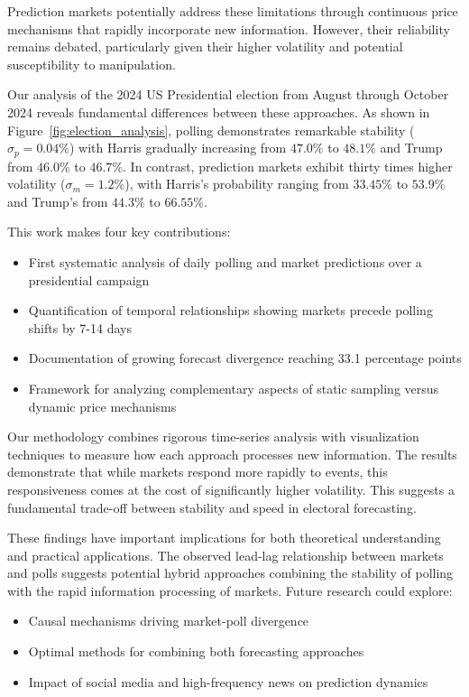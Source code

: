 \documentclass{article} %
\begin{document}
Prediction markets potentially address these limitations through continuous price mechanisms that rapidly incorporate new information. However, their reliability remains debated, particularly given their higher volatility and potential susceptibility to manipulation.

Our analysis of the 2024 US Presidential election from August through October 2024 reveals fundamental differences between these approaches. As shown in Figure~\ref{fig:election_analysis}, polling demonstrates remarkable stability ($\sigma_p = 0.04\%$) with Harris gradually increasing from $47.0\%$ to $48.1\%$ and Trump from $46.0\%$ to $46.7\%$. In contrast, prediction markets exhibit thirty times higher volatility ($\sigma_m = 1.2\%$), with Harris's probability ranging from $33.45\%$ to $53.9\%$ and Trump's from $44.3\%$ to $66.55\%$.

This work makes four key contributions:
\begin{itemize}
    \item First systematic analysis of daily polling and market predictions over a presidential campaign
    \item Quantification of temporal relationships showing markets precede polling shifts by 7-14 days
    \item Documentation of growing forecast divergence reaching 33.1 percentage points
    \item Framework for analyzing complementary aspects of static sampling versus dynamic price mechanisms
\end{itemize}

Our methodology combines rigorous time-series analysis with visualization techniques to measure how each approach processes new information. The results demonstrate that while markets respond more rapidly to events, this responsiveness comes at the cost of significantly higher volatility. This suggests a fundamental trade-off between stability and speed in electoral forecasting.

These findings have important implications for both theoretical understanding and practical applications. The observed lead-lag relationship between markets and polls suggests potential hybrid approaches combining the stability of polling with the rapid information processing of markets. Future research could explore:
\begin{itemize}
    \item Causal mechanisms driving market-poll divergence
    \item Optimal methods for combining both forecasting approaches
    \item Impact of social media and high-frequency news on prediction dynamics
\end{itemize}
\end{document}
